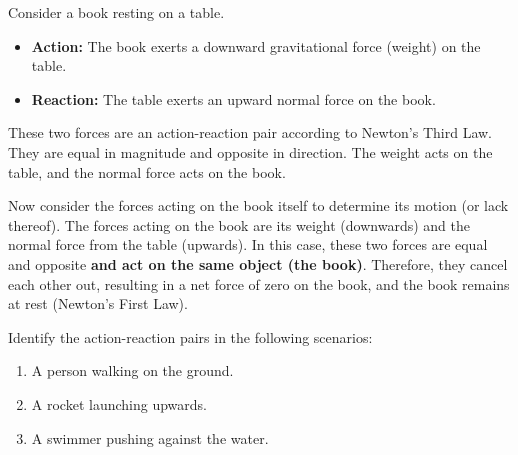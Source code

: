 \begin{example}
Consider a book resting on a table.
\begin{itemize}
    \item \textbf{Action:} The book exerts a downward gravitational force (weight) on the table.
    \item \textbf{Reaction:} The table exerts an upward normal force on the book.
\end{itemize}
These two forces are an action-reaction pair according to Newton's Third Law. They are equal in magnitude and opposite in direction.  The weight acts on the table, and the normal force acts on the book.

Now consider the forces acting on the book itself to determine its motion (or lack thereof).  The forces acting on the book are its weight (downwards) and the normal force from the table (upwards).  In this case, these two forces are equal and opposite \textbf{and act on the same object (the book)}. Therefore, they cancel each other out, resulting in a net force of zero on the book, and the book remains at rest (Newton's First Law).
\end{example}

\begin{stopandthink}
Identify the action-reaction pairs in the following scenarios:
\begin{enumerate}
    \item A person walking on the ground.
    \item A rocket launching upwards.
    \item A swimmer pushing against the water.
\end{enumerate}
\end{stopandthink}

